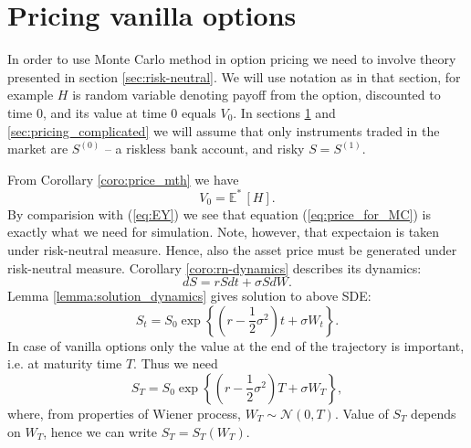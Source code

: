 \documentclass[a4paper,12pt, oneside]{book}
\theoremstyle{definition}
\theoremstyle{remark}
\def\Em{{\mathbb{E}^*}\,}
\begin{document}
\section{Pricing vanilla options}
\label{sec:pricing_vanilla}

In order to use Monte Carlo method in option pricing we need to involve theory presented in section \ref{sec:risk-neutral}. We will use notation as in that section, for example $H$ is random variable denoting payoff from the option, discounted to time 0, and its value at time 0 equals $V_0$. In sections \ref{sec:pricing_vanilla} and \ref{sec:pricing_complicated} we will assume that only instruments traded in the market are $S^{(0)}$ -- a riskless bank account, and risky $S = S^{(1)}$.

From Corollary \ref{coro:price_mth} we have
\begin{equation}
 \label{eq:price_for_MC}
 V_0 = \Em[H].%
\end{equation}
By comparision with (\ref{eq:EY}) we see that equation (\ref{eq:price_for_MC}) is exactly what we need for simulation. Note, however, that expectaion is taken under risk-neutral measure. Hence, also the asset price must be generated under risk-neutral measure. Corollary \ref{coro:rn-dynamics} describes its dynamics:
\[ dS = rSdt + \sigma S dW. \]
Lemma \ref{lemma:solution_dynamics} gives solution to above SDE:
\begin{equation}
 \label{eq:vanilla_St}
 S_t = S_0 \exp\left\{ (r - \frac{1}{2}\sigma^2)t + \sigma W_t \right\}.
\end{equation}
In case of vanilla options only the value at the end of the trajectory is important, i.e. at maturity time $T$. Thus we need
\begin{equation}
\label{eq:vanilla_ST}
 S_T = S_0 \exp\left\{ (r - \frac{1}{2}\sigma^2)T + \sigma W_T \right\},
\end{equation}
where, from properties of Wiener process, $W_T \sim \mathcal{N}(0,T)$. Value of $S_T$ depends on $W_T$, hence we can write $S_T = S_T(W_T)$.
\end{document}
